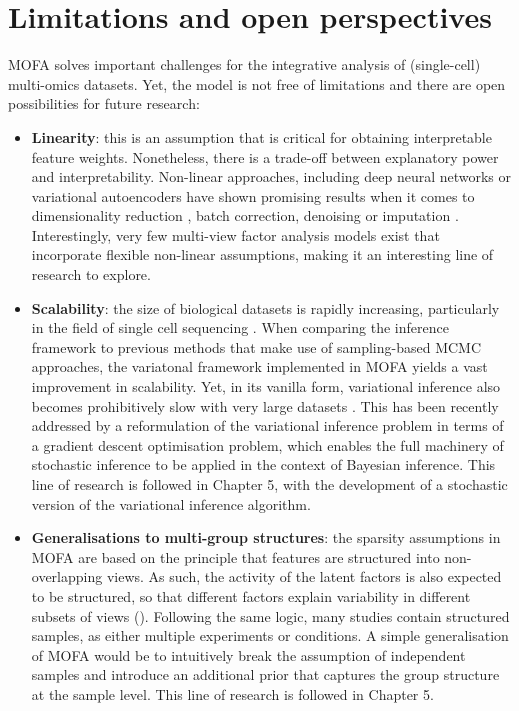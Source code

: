 \section{Limitations and open perspectives}

MOFA solves important challenges for the integrative analysis of (single-cell) multi-omics datasets. Yet, the model is not free of limitations and there are open possibilities for future research:

\begin{itemize}

	\item \textbf{Linearity}: this is an assumption that is critical for obtaining interpretable feature weights. Nonetheless, there is a trade-off between explanatory power and interpretability\cite{Kuhn}. Non-linear approaches, including deep neural networks or variational autoencoders have shown promising results when it comes to dimensionality reduction \cite{Lin2017,Ding2018,Lopez2018}, batch correction\cite{Lopez2018}, denoising \cite{Eraslan2019} or imputation \cite{Lin2016}. Interestingly, very few multi-view factor analysis models exist that incorporate flexible non-linear assumptions, making it an interesting line of research to explore.

	\item \textbf{Scalability}: the size of biological datasets is rapidly increasing, particularly in the field of single cell sequencing \cite{Svensson2018,Cao2019}. When comparing the inference framework to previous methods that make use of sampling-based MCMC approaches, the variatonal framework implemented in MOFA yields a vast improvement in scalability. Yet, in its vanilla form, variational inference also becomes prohibitively slow with very large datasets \cite{Hoffman2013,Blei2016,Hoffman2014}. This has been recently addressed by a reformulation of the variational inference problem in terms of a gradient descent optimisation problem, which enables the full machinery of stochastic inference to be applied in the context of Bayesian inference. This line of research is followed in Chapter 5, with the development of a stochastic version of the variational inference algorithm.

	\item \textbf{Generalisations to multi-group structures}: the sparsity assumptions in MOFA are based on the principle that features are structured into non-overlapping views. As such, the activity of the latent factors is also expected to be structured, so that different factors explain variability in different subsets of views (). Following the same logic, many studies contain structured samples, as either multiple experiments or conditions. A simple generalisation of MOFA would be to intuitively break the assumption of independent samples and introduce an additional prior that captures the group structure at the sample level. This line of research is followed in Chapter 5.


\end{itemize}
